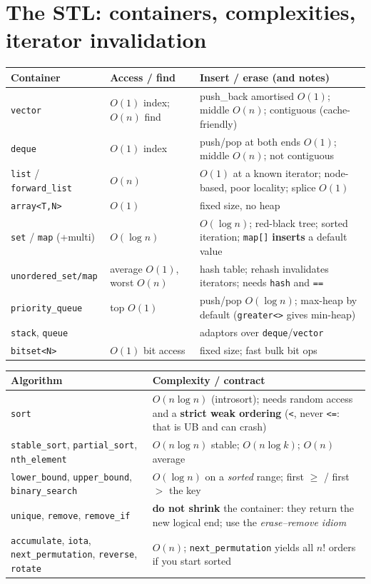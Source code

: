 \documentclass[10pt,a4paper,openany,oneside]{report}
\newcommand{\prio}[1]{\texorpdfstring{\ifcase#1\or{\color{gold}\ding{72}}\or{\color{gold}\ding{72}\ding{72}}\or{\color{gold}\ding{72}\ding{72}\ding{72}}\fi}{}}
\begin{document}
\section{The STL: containers, complexities, iterator invalidation \prio{3}}
\begin{center}\small
\begin{xltabular}{\textwidth}{@{}L{3.1cm}L{3.0cm}Y@{}}
\toprule
\textbf{Container} & \textbf{Access / find} & \textbf{Insert / erase (and notes)}\\
\midrule\endhead
\texttt{vector} & $O(1)$ index; $O(n)$ find & push\_back amortised $O(1)$; middle $O(n)$; contiguous (cache-friendly)\\
\texttt{deque} & $O(1)$ index & push/pop at both ends $O(1)$; middle $O(n)$; not contiguous\\
\texttt{list} / \texttt{forward\_list} & $O(n)$ & $O(1)$ at a known iterator; node-based, poor locality; splice $O(1)$\\
\texttt{array<T,N>} & $O(1)$ & fixed size, no heap\\
\texttt{set} / \texttt{map} (+multi) & $O(\log n)$ & $O(\log n)$; red-black tree; sorted iteration; \texttt{map[]} \textbf{inserts} a default value\\
\texttt{unordered\_set/map} & average $O(1)$, worst $O(n)$ & hash table; rehash invalidates iterators; needs \texttt{hash} and \texttt{==}\\
\texttt{priority\_queue} & top $O(1)$ & push/pop $O(\log n)$; max-heap by default (\texttt{greater<>} gives min-heap)\\
\texttt{stack}, \texttt{queue} & & adaptors over \texttt{deque}/\texttt{vector}\\
\texttt{bitset<N>} & $O(1)$ bit access & fixed size; fast bulk bit ops\\
\bottomrule
\end{xltabular}
\end{center}
\begin{center}\small
\begin{xltabular}{\textwidth}{@{}L{4.3cm}Y@{}}
\toprule
\textbf{Algorithm} & \textbf{Complexity / contract}\\
\midrule\endhead
\texttt{sort} & $O(n\log n)$ (introsort); needs random access and a \textbf{strict weak ordering} (\texttt{<}, never \texttt{<=}: that is UB and can crash)\\
\texttt{stable\_sort}, \texttt{partial\_sort}, \texttt{nth\_element} & $O(n\log n)$ stable; $O(n\log k)$; $O(n)$ average\\
\texttt{lower\_bound}, \texttt{upper\_bound}, \texttt{binary\_search} & $O(\log n)$ on a \emph{sorted} range; first $\ge$ / first $>$ the key\\
\texttt{unique}, \texttt{remove}, \texttt{remove\_if} & \textbf{do not shrink} the container: they return the new logical end; use the \emph{erase--remove idiom}\\
\texttt{accumulate}, \texttt{iota}, \texttt{next\_permutation}, \texttt{reverse}, \texttt{rotate} & $O(n)$; \texttt{next\_permutation} yields all $n!$ orders if you start sorted\\
\bottomrule
\end{xltabular}
\end{center}
\end{document}
